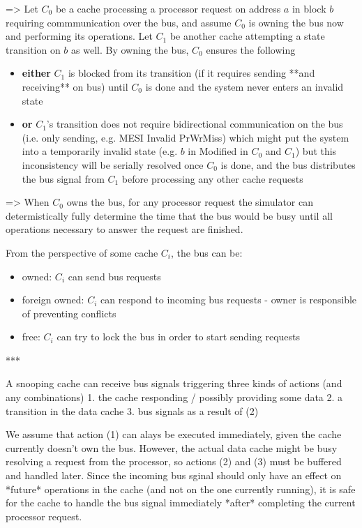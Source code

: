 \documentclass{article}
\begin{document}
\begin{multicols}{2}
=> Let $C_0$ be a cache processing a processor request on address $a$ in block $b$ requiring commmunication over the bus, and assume $C_0$ is owning the bus now and performing its operations. Let $C_1$ be another cache attempting a state transition on $b$ as well. By owning the bus, $C_0$ ensures the following

\begin{itemize}
    \item \textbf{either} $C_1$ is blocked from its transition (if it requires sending **and receiving** on bus) until $C_0$ is done and the system never enters an invalid state
    \item \textbf{or} $C_1$'s transition does not require bidirectional communication on the bus (i.e. only sending, e.g. MESI Invalid PrWrMiss) which might put the system into a temporarily invalid state (e.g. $b$ in Modified in $C_0$ and $C_1$) but this inconsistency will be serially resolved once $C_0$ is done, and the bus distributes the bus signal from $C_1$ before processing any other cache requests
\end{itemize}

=> When $C_0$ owns the bus, for any processor request the simulator can determistically fully determine the time that the bus would be busy until all operations necessary to answer the request are finished.

From the perspective of some cache $C_i$, the bus can be:

\begin{itemize}
    \item owned: $C_i$ can send bus requests
    \item foreign owned: $C_i$ can respond to incoming bus requests - owner is responsible of preventing conflicts
    \item free: $C_i$ can try to lock the bus in order to start sending requests
\end{itemize}

\end{multicols}

***

A snooping cache can receive bus signals triggering three kinds of actions (and any combinations)
    1. the cache responding / possibly providing some data
    2. a transition in the data cache
    3. bus signals as a result of (2)

We assume that action (1) can alays be executed immediately, given the cache currently doesn't own the bus. However, the actual data cache might be busy resolving a request from the processor, so actions (2) and (3) must be buffered and handled later. Since the incoming bus sginal should only have an effect on *future* operations in the cache (and not on the one currently running), it is safe for the cache to handle the bus signal immediately *after* completing the current processor request.
\end{document}
